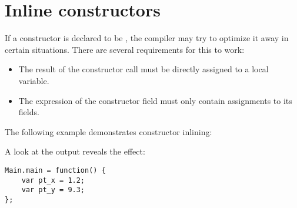 \section{Inline constructors}
\label{lf-inline-constructor}

If a constructor is declared to be , the compiler may try to optimize it away in certain situations. There are several requirements for this to work:

\begin{itemize}
	\item The result of the constructor call must be directly assigned to a local variable.
	\item The expression of the constructor field must only contain assignments to its fields.
\end{itemize}

The following example demonstrates constructor inlining:


A look at the  output reveals the effect:

\begin{lstlisting}
Main.main = function() {
	var pt_x = 1.2;
	var pt_y = 9.3;
};
\end{lstlisting}
